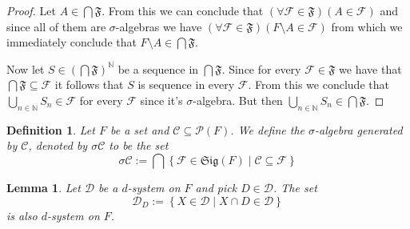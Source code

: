 \documentclass[a4paper]{amsart}
\newtheorem{deff}{Definition}
\newtheorem{lem}{Lemma}
\newcommand{\pow}[1]{\mathscr{P}\left(#1\right)}
\newcommand{\sig}[1]{\mathfrak{Sig}\left(#1\right)}
\newcommand{\NN}{\mathbb{N}}
\begin{document}
\begin{proof}
    Let $A \in \bigcap \mathfrak{F}$. From this we can conclude that 
    $\left(\forall \mathcal{F} \in \mathfrak{F}\right) \left(A \in \mathcal{F}\right) $ and since all of them are 
    $\sigma$-algebras we have 
    $\left(\forall \mathcal{F} \in \mathfrak{F}\right) \left(F \setminus A \in \mathcal{F}\right)$ 
    from which we immediately conclude that $F \setminus A \in \bigcap \mathfrak{F}$.
    
    Now let $S \in \left(\bigcap\mathfrak{F}\right)^\NN$ be a 
    sequence in $\bigcap\mathfrak{F}$. Since for every 
    $\mathcal{F} \in \mathfrak{F}$ we have that
    $\bigcap\mathfrak{F} \subseteq \mathcal{F}$ it follows 
    that $S$ is sequence in every $\mathcal{F}$. From this we 
    conclude that 
    $\bigcup\limits_{n\in \NN} S_n \in \mathcal{F}$ for every $\mathcal{F}$ 
    since it's $\sigma$-algebra. 
    But then  $ \bigcup\limits_{n\in \NN} S_n \in  \bigcap \mathfrak{F}$.
\end{proof}

\begin{deff}
    Let $F$ be a set and $\mathcal{C} \subseteq \pow{F}$. We 
    define the $\sigma$-algebra generated by $\mathcal{C}$, 
    denoted by $\sigma\mathcal{C}$ to be the set
    $$
    \sigma\mathcal{C} := \bigcap\left\{ \mathcal{F} \in \sig{F} \mid \mathcal{C} \subseteq \mathcal{F} \right\}
    $$
\end{deff}

\begin{lem}
    Let $\mathcal{D}$ be a $d$-system on $F$ and pick $D \in \mathcal{D}$. The set 
    $$ \mathcal{D}_D := \left\{ X \in \mathcal{D} \mid X \cap D \in \mathcal{D} \right\} $$
    is also $d$-system on $F$.
\end{lem}
\end{document}

